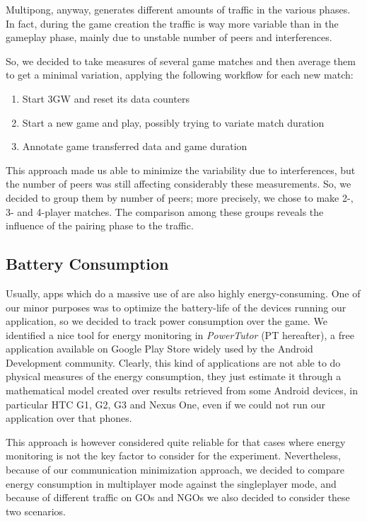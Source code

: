 Multipong, anyway, generates different amounts of traffic in the various
phases. In fact, during the game creation the traffic is way more variable than
in the gameplay phase, mainly due to unstable number of peers and \wifi{}
interferences.

So, we decided to take measures of several game matches and then average them to get a minimal variation, applying the following workflow for each new match:

\begin{enumerate} %
  \item Start 3GW and reset its data counters
  \item Start a new game and play, possibly trying to variate match duration
  \item Annotate game transferred data and game duration
\end{enumerate}

This approach made us able to minimize the variability due to interferences, but the number of peers was still affecting considerably these measurements. So, we decided to group them by number of peers; more precisely, we chose to make 2-, 3- and 4-player matches. The comparison among these groups reveals the influence of the pairing phase to the traffic.

\subsection{Battery Consumption}

Usually, apps which do a massive use of \wifi{} are also highly energy-consuming. One of our minor purposes was to optimize the battery-life of the devices running our application, so we decided to track power consumption over the game. We identified a nice tool for energy monitoring in \textit{PowerTutor} (PT hereafter), a free application available on Google Play Store widely used by the Android Development community. Clearly, this kind of applications are not able to do physical measures of the energy consumption, they just estimate it through a mathematical model created over results retrieved from some Android devices, in particular HTC G1, G2, G3 and Nexus One, even if we could not run our application over that phones. 

This approach is however considered quite reliable for that cases where energy monitoring is not the key factor to consider for the experiment. Nevertheless, because of our communication minimization approach, we decided to compare energy consumption in multiplayer mode against the singleplayer mode, and because of different traffic on GOs and NGOs we also decided to consider these two scenarios.
